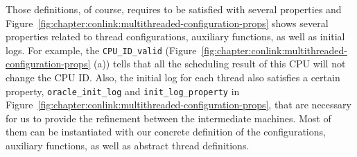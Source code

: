 Those definitions, of course, requires to be satisfied with several properties and Figure~\ref{fig:chapter:conlink:multithreaded-configuration-props} shows several properties related to thread configurations, auxiliary functions, as well as initial logs.
For example, 
the \lstinline$CPU_ID_valid$ (Figure~\ref{fig:chapter:conlink:multithreaded-configuration-props} (a))
tells that all the scheduling result of this CPU 
will not change the CPU ID. 
Also, the initial log for each thread also satisfies a certain property, \lstinline$oracle_init_log$ and \lstinline$init_log_property$
in Figure~\ref{fig:chapter:conlink:multithreaded-configuration-props},
that are necessary for us to provide the 
refinement between the intermediate machines. 
Most of them can be instantiated with our concrete definition of the configurations, auxiliary functions,
as well as abstract thread definitions. 





%

